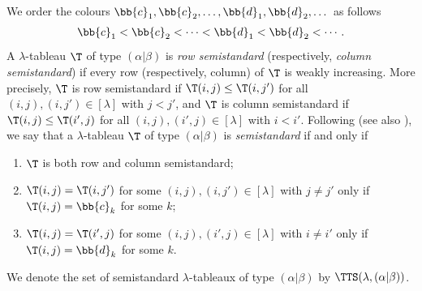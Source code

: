 We order the colours $\bb{c}_1,\bb{c}_2,\dotsc,\bb{d}_1,\bb{d}_2,\dotsc$ as follows
\begin{gather*}\bb{c}_1<\bb{c}_2<\cdots<\bb{d}_1<\bb{d}_2<\cdots.\end{gather*} A $\lambda$-tableau $\T$ of type $(\alpha|\beta)$ is {\em row semistandard} (respectively, {\em column semistandard}) if every row (respectively, column) of $\T$ is weakly increasing. More precisely, $\T$ is row semistandard if $\T(i,j) \leq \T(i, j')$ for all $(i,j), (i,j') \in [\lambda]$ with $j < j'$, and $\T$ is column semistandard if $\T(i,j) \leq \T(i', j)$ for all $(i,j), (i',j) \in [\lambda]$ with $i < i'$. Following \cite[Section~1.2]{Se} (see also \cite[Section~4]{DR}), we say that
a $\lambda$-tableau $\T$ of type $(\alpha|\beta)$ is {\em semistandard} if and only if
\begin{enumerate}\itemsep=0pt
\item [(i)] $\T$ is both row and column semistandard;
\item [(ii)] $\T(i,j) = \T(i,j')$ for some $(i,j),(i,j') \in [\lambda]$ with $j\ne j'$ only if $\T(i,j) = \bb{c}_k$ for some $k$;
\item [(iii)] $\T(i,j) = \T(i',j)$ for some $(i,j),(i',j) \in [\lambda]$ with $i\ne i'$ only if $\T(i,j) = \bb{d}_k$ for some $k$.
\end{enumerate}
We denote the set of semistandard $\lambda$-tableaux of type $(\alpha|\beta)$ by $\TTS(\lambda, (\alpha|\beta))$.

